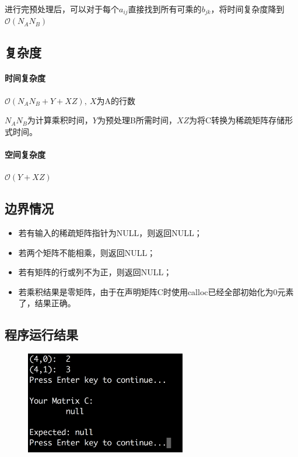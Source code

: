 \documentclass{homework}
\begin{document}
进行完预处理后，可以对于每个$a_{ij}$直接找到所有可乘的$b_{jk}$，将时间复杂度降到$\mathcal{O}(N_AN_B)$
\subsection{复杂度}
\paragraph{时间复杂度}
$\mathcal{O}(N_AN_B+Y+XZ),~X$为A的行数

$N_AN_B$为计算乘积时间，$Y$为预处理B所需时间，$XZ$为将C转换为稀疏矩阵存储形式时间。
\paragraph{空间复杂度}
$\mathcal{O}(Y+XZ)$
\subsection{边界情况}
\begin{itemize}
    \item 若有输入的稀疏矩阵指针为NULL，则返回NULL；
    \item 若两个矩阵不能相乘，则返回NULL；
    \item 若有矩阵的行或列不为正，则返回NULL；
    \item 若乘积结果是零矩阵，由于在声明矩阵C时使用calloc已经全部初始化为0元素了，结果正确。
\end{itemize}
\subsection{程序运行结果}
\begin{figure}[H]
    \centering
    \includegraphics[width=7cm]{fig2.png}
\end{figure}
\end{document}
